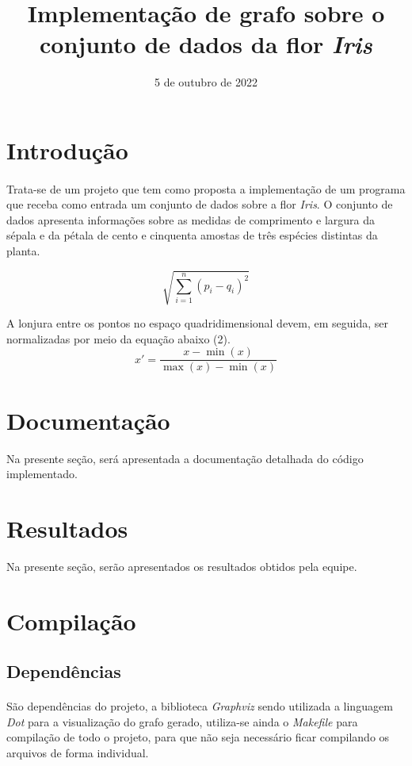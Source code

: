 \documentclass{article}
\title{Implementação de grafo sobre o conjunto de dados da flor {\it Iris\/}}
\author{\sc{Elian Babireski \& Vinícios Bidin}}
\date{5 de outubro de 2022}
\begin{document}
    \maketitle
    
    \section{Introdução}
        \paragraph{} Trata-se de um projeto que tem como proposta a implementação de um programa que receba como entrada um conjunto de dados sobre a flor {\it Iris}. O conjunto de dados apresenta informações sobre as medidas de comprimento e largura da sépala e da pétala de cento e cinquenta amostas de três espécies distintas da planta.
    
        \begin{equation}
            \sqrt{\sum_{i = 1} ^ n {(p_i - q_i)} ^ 2}
        \end{equation}

        A lonjura entre os pontos no espaço quadridimensional devem, em seguida, ser normalizadas por meio da equação abaixo (2).
        \begin{equation}
            x' = \frac{x - \min(x)}{\max(x) - \min(x)}
        \end{equation}


    \section{Documentação}
        Na presente seção, será apresentada a documentação detalhada do código implementado.

    \section{Resultados}
        Na presente seção, serão apresentados os resultados obtidos pela equipe.
    
    \section{Compilação}
        \subsection{Dependências}
            \paragraph{} São dependências do projeto, a biblioteca {\it Graphviz} sendo utilizada a linguagem {\it Dot} para a visualização do grafo gerado, utiliza-se ainda o {\it Makefile} para compilação de todo o projeto, para que não seja necessário ficar compilando os arquivos de forma individual.
        
\end{document}
